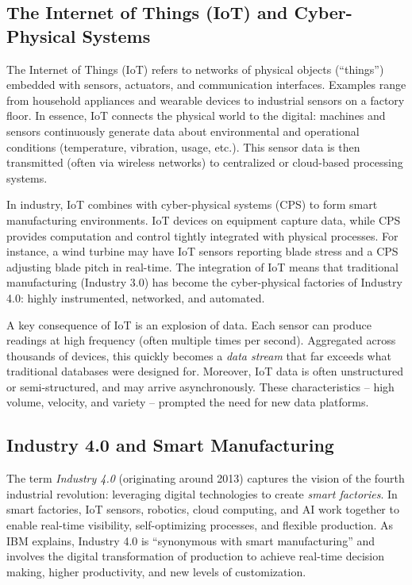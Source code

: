 \subsection{The Internet of Things (IoT) and Cyber-Physical Systems}
The Internet of Things (IoT) refers to networks of physical objects (“things”) embedded with sensors, actuators, and communication interfaces. Examples range from household appliances and wearable devices to industrial sensors on a factory floor. In essence, IoT connects the physical world to the digital: machines and sensors continuously generate data about environmental and operational conditions (temperature, vibration, usage, etc.). This sensor data is then transmitted (often via wireless networks) to centralized or cloud-based processing systems. 

In industry, IoT combines with cyber-physical systems (CPS) to form smart manufacturing environments. IoT devices on equipment capture data, while CPS provides computation and control tightly integrated with physical processes. For instance, a wind turbine may have IoT sensors reporting blade stress and a CPS adjusting blade pitch in real-time. The integration of IoT means that traditional manufacturing (Industry 3.0) has become the cyber-physical factories of Industry 4.0: highly instrumented, networked, and automated.

A key consequence of IoT is an explosion of data. Each sensor can produce readings at high frequency (often multiple times per second). Aggregated across thousands of devices, this quickly becomes a \emph{data stream} that far exceeds what traditional databases were designed for. Moreover, IoT data is often unstructured or semi-structured, and may arrive asynchronously. These characteristics – high volume, velocity, and variety – prompted the need for new data platforms.

\subsection{Industry 4.0 and Smart Manufacturing}
The term \emph{Industry 4.0} (originating around 2013) captures the vision of the fourth industrial revolution: leveraging digital technologies to create \emph{smart factories}. In smart factories, IoT sensors, robotics, cloud computing, and AI work together to enable real-time visibility, self-optimizing processes, and flexible production. As IBM explains, Industry 4.0 is “synonymous with smart manufacturing” and involves the digital transformation of production to achieve real-time decision making, higher productivity, and new levels of customization. 

